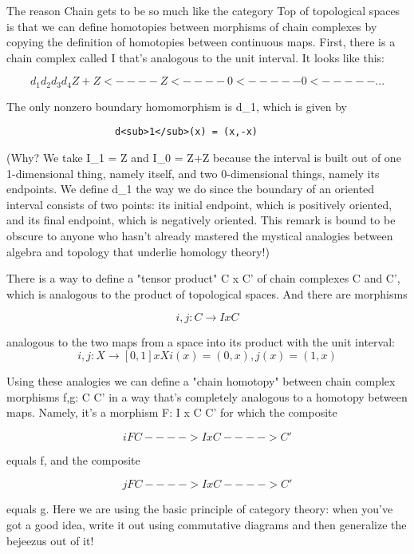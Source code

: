 The reason Chain gets to be so much like the category Top of topological
spaces is that we can define homotopies between morphisms of chain
complexes by copying the definition of homotopies between continuous
maps.  First, there is a chain complex called I that's analogous to the
unit interval.  It looks like this:

$$
             d_{1}      d_{2}       d_{3}      d_{4}
       Z+Z <---- Z <---- 0 <----- 0 <----- ...

$$
    
The only nonzero boundary homomorphism is d_{1}, which is given by 

\begin{verbatim}
                   d<sub>1</sub>(x) = (x,-x)
\end{verbatim}
    
(Why?  We take I_{1} = Z and I_{0} = Z+Z because the interval is built out
of one 1-dimensional thing, namely itself, and two 0-dimensional things,
namely its endpoints.  We define d_{1} the way we do since the boundary of
an oriented interval consists of two points: its initial endpoint, which
is positively oriented, and its final endpoint, which is negatively
oriented.  This remark is bound to be obscure to anyone who hasn't
already mastered the mystical analogies between algebra and topology
that underlie homology theory!)

There is a way to define a "tensor product" C x C' of chain complexes C
and C', which is analogous to the product of topological spaces.  And
there are morphisms

$$
                    i,j: C \to  I x C
$$
    
analogous to the two maps from a space into its product with the unit
interval:
$$
                 i, j: X \to  [0,1] x X         
              

             i(x) = (0,x),    j(x) = (1,x) 
$$
    
Using these analogies we can define a "chain homotopy" between chain
complex morphisms f,g: C \to  C' in a way that's completely analogous to a
homotopy between maps.  Namely, it's a morphism F: I x C \to  C' for which
the composite

$$
                    i           F
                C ----> I x C ----> C'
$$
    
equals f, and the composite

$$
                    j           F
                C ----> I x C ----> C'
$$
    
equals g.   Here we are using the basic principle of category theory:
when you've got a good idea, write it out using commutative diagrams
and then generalize the bejeezus out of it!  

